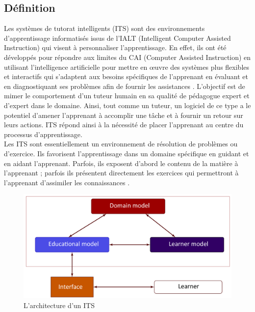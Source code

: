 \subsection{Définition}
Les systèmes de tutorat intelligents (ITS) sont des environnements d'apprentissage informatisés issus de l'IALT (Intelligent Computer Assisted Instruction) qui visent à personnaliser l'apprentissage. En effet, ils ont été développés pour répondre aux limites du CAI (Computer Assisted Instruction) en utilisant l'intelligence artificielle pour mettre en œuvre des systèmes plus flexibles et interactifs qui s'adaptent aux besoins spécifiques de l'apprenant en évaluant et en diagnostiquant ses problèmes afin de fournir les assistances \cite{buchecedric}. L'objectif est de mimer le comportement d'un tuteur humain en sa qualité de pédagogue expert et d'expert dans le domaine. Ainsi, tout comme un tuteur, un logiciel de ce type a le potentiel d'amener l'apprenant à accomplir une tâche et à fournir un retour sur leurs actions. ITS répond ainsi à la nécessité de placer l'apprenant au centre du processus d'apprentissage. \\
Les ITS sont essentiellement un environnement de résolution de problèmes ou d'exercice. Ils favorisent l'apprentissage dans un domaine spécifique en guidant et en aidant l'apprenant. Parfois, ils exposent d'abord le contenu de la matière à l’apprenant ; parfois ils présentent directement les exercices qui permettront à l'apprenant d'assimiler les connaissances \cite{handbook_of_educational_data_mining}.

\begin{figure}[H]
	\begin{center}
		\includegraphics[width=\textwidth]{images/chapitre1/ITS architecture}
	\end{center}
\caption{L’architecture d’un ITS}
\label{itsArchitecture}
\end{figure}

